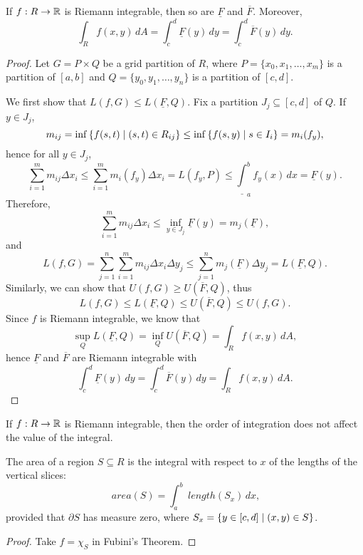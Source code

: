 \begin{thm}
    If $f: R \to {\mathbb R}$ is Riemann integrable, then so are $\underline{F}$ and $\overline{F}$. Moreover,
    \[
    \int_R f(x, y) \, dA = \int_c^d \underline{F}(y) \, dy = \int_c^d \overline{F}(y) \, dy.
    \]
    \begin{proof}
        Let $G = P \times Q$ be a grid partition of $R$, where $P = \{x_0, x_1, \ldots, x_m\}$ is a partition of $[a, b]$ and $Q = \{y_0, y_1, \ldots, y_n\}$ is a partition of $[c, d]$. 

        We first show that $L(f, G) \leq L(\underline{F}, Q)$. Fix a partition $J_j \subseteq [c, d]$ of $Q$. If $y \in J_j$, 
        \[
        m_{ij} = \inf {\left\{{f(s, t) \mid (s, t) \in R_{ij}}\right\}} \leq \inf {\left\{{f(s, y) \mid s \in I_i}\right\}} = m_i(f_y),
        \]
        hence for all $y \in J_j$,
        \[
        \sum_{i=1}^m m_{ij} \Delta x_i \leq \sum_{i=1}^m m_i(f_y) \Delta x_i = L(f_y, P) \leq \underline{\int}_a^b f_y(x) \, dx = \underline{F}(y).
        \]
        Therefore,
        \[
        \sum_{i=1}^m m_{ij} \Delta x_i \leq \inf_{y \in J_j} \underline{F}(y) = m_j(\underline{F}),
        \]
        and
        \[
        L(f, G) = \sum_{j=1}^n \sum_{i=1}^m m_{ij} \Delta x_i \Delta y_j \leq \sum_{j=1}^n m_j(\underline{F}) \Delta y_j = L(\underline{F}, Q).
        \]
        Similarly, we can show that $U(f, G) \geq U(\overline{F}, Q)$, thus
        \[
        L(f, G) \leq L(\underline{F}, Q) \leq U(\overline{F}, Q) \leq U(f, G).
        \]
        Since $f$ is Riemann integrable, we know that
        \[
        \sup_Q L(\underline{F}, Q) = \inf_Q U(\overline{F}, Q) = \int_R f(x, y) \, dA,
        \]
        hence $\underline{F}$ and $\overline{F}$ are Riemann integrable with
        \[
        \int_c^d \underline{F}(y) \, dy = \int_c^d \overline{F}(y) \, dy = \int_R f(x, y) \, dA.
        \]
    \end{proof}
\end{thm}

\begin{cl}
    If $f: R \to {\mathbb R}$ is Riemann integrable, then the order of integration does not affect the value of the integral.
\end{cl}

\begin{cl}
    The area of a region $S \subseteq R$ is the integral with respect to $x$ of the lengths of the vertical slices:
    \[
    ~area (S) = \int_a^b ~length (S_x) \, dx,
    \]
    provided that $\partial S$ has measure zero, where $S_x = {\left\{{y \in [c, d] \mid (x, y) \in S}\right\}}$.
    \begin{proof}
        Take $f = \chi_S$ in Fubini's Theorem.
    \end{proof}
\end{cl}